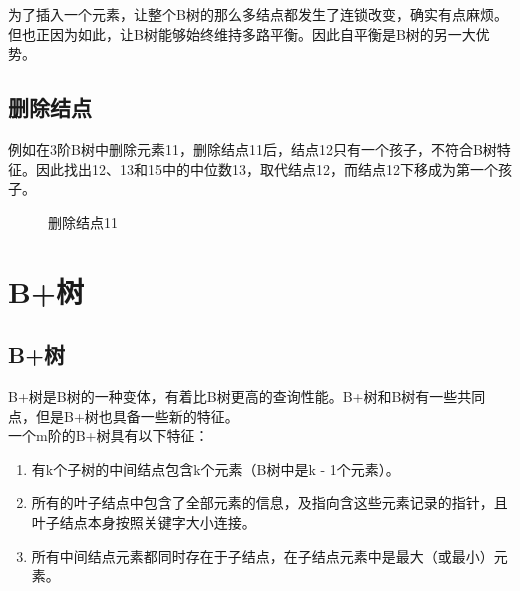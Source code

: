 为了插入一个元素，让整个B树的那么多结点都发生了连锁改变，确实有点麻烦。但也正因为如此，让B树能够始终维持多路平衡。因此自平衡是B树的另一大优势。\\

\subsection{删除结点}

例如在3阶B树中删除元素11，删除结点11后，结点12只有一个孩子，不符合B树特征。因此找出12、13和15中的中位数13，取代结点12，而结点12下移成为第一个孩子。

\begin{figure}[H]
	\centering
	\caption{删除结点11}
\end{figure}

\newpage

\section{B+树}

\subsection{B+树}

B+树是B树的一种变体，有着比B树更高的查询性能。B+树和B树有一些共同点，但是B+树也具备一些新的特征。\\

一个m阶的B+树具有以下特征：

\begin{enumerate}
	\item 有k个子树的中间结点包含k个元素（B树中是k - 1个元素）。

	\item 所有的叶子结点中包含了全部元素的信息，及指向含这些元素记录的指针，且叶子结点本身按照关键字大小连接。

	\item 所有中间结点元素都同时存在于子结点，在子结点元素中是最大（或最小）元素。
\end{enumerate}


